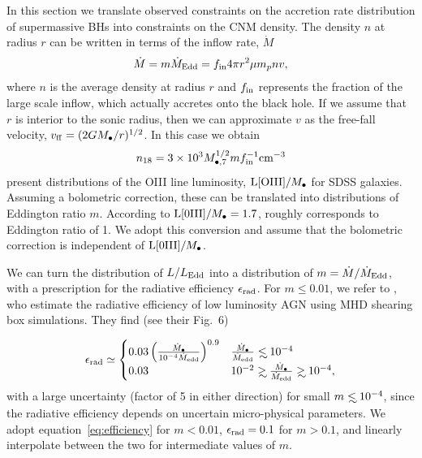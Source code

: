 \documentclass[usenatbib,fleqn]{mnras}
\newcommand\lsim{\mathrel{\rlap{\lower4pt\hbox{\hskip1pt$\sim$}}
    \raise1pt\hbox{$<$}}}
\newcommand\gsim{\mathrel{\rlap{\lower4pt\hbox{\hskip1pt$\sim$}}
    \raise1pt\hbox{$>$}}}
\newcommand{\Mbh}[1][]{M_{\bullet#1}}
\begin{document}
In this section we translate observed constraints on the accretion
rate distribution of supermassive BHs into constraints on the CNM
density.  The density $n$ at radius $r$ can be written in terms of the
inflow rate, $\dot{M}$
\begin{equation}
\dot{M} = m \dot{M}_{\rm Edd}= f_{\rm in} 4 \pi r^2 \mu m_p n v,
\label{eq:mdot}
\end{equation}
where $n$ is the average density at radius $r$ and $f_{\rm in}$
represents the fraction of the large scale inflow, which actually
accretes onto the black hole.  If we assume that $r$ is interior to
the sonic radius, then we can approximate $v$ as the free-fall
velocity, $v_{\rm ff} = (2 G \Mbh/r)^{1/2}$.  In this case we
obtain
\begin{equation}
n_{18} = 3 \times 10^3 M_{\bullet,7}^{1/2} m f_{\rm in}^{-1} {\rm
  cm}^{-3}
\label{eq:n18Edd}
\end{equation}
%
\citet{Kauffmann&Heckman2009} present distributions of the OIII line
luminosity, ${\rm L[OIII]}/\Mbh$ for SDSS galaxies.  Assuming a bolometric
correction, these can be translated into distributions of Eddington
ratio $m$.  According to \citet{Kauffmann&Heckman2009} ${\rm
  L[0III]}/\Mbh=1.7$, roughly corresponds to Eddington ratio of 1. We
adopt this conversion and assume that the bolometric correction is
independent of ${\rm L[0III]}/\Mbh$. 

We can turn the distribution of $L/L_{\rm Edd}$ into a distribution of
$m=\dot{M}/\dot{M}_{\rm Edd}$, with a prescription for the radiative
efficiency $\epsilon_{\rm rad}$.  For $m \leq 0.01$, we refer to
\citet{Sharma+2007}, who estimate the radiative efficiency of low
luminosity AGN using MHD shearing box simulations.  They find (see
their Fig.~6)

\begin{align}
\epsilon_{\rm rad} \simeq 
\begin{cases}
  0.03 \left(\frac{\dot{M}_{\bullet}}{10^{-4}\dot{M}_{\rm edd}}\right)^{0.9} & \frac{\dot{M}_{\bullet}}{\dot{M}_{\rm edd}} \lsim 10^{-4} \\
 0.03 &  10^{-2} \gsim \frac{\dot{M}_{\bullet}}{\dot{M}_{\rm edd}} \gsim  10^{-4},
\end{cases}
\label{eq:efficiency}
\end{align}
%
with a large uncertainty (factor of 5 in either direction) for small
$m\lsim 10^{-4}$, since the radiative efficiency depends on uncertain
micro-physical parameters. We adopt equation~\eqref{eq:efficiency} for
$m <0.01$, $\epsilon_{\rm rad}=0.1$ for $m>0.1$, and linearly
interpolate between the two for intermediate values of $m$.
\end{document}
